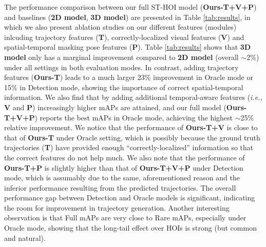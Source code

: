 \documentclass[sigconf]{acmart}
\begin{document}
The performance comparison between our full ST-HOI model (\textbf{Ours-T+V+P}) and baselines (\textbf{2D model}, \textbf{3D model}) are presented in Table \ref{tab:results}, in which we also present ablation studies on our different features (modules) inlcuding trajectory features (\textbf{T}), correctly-localized visual features (\textbf{V}) and spatial-temporal masking pose features (\textbf{P}).
Table \ref{tab:results} shows that \textbf{3D model} only has a marginal improvement compared to \textbf{2D model} (overall $\sim$2\%) under all settings in both evaluation modes.
In contrast, adding trajectory features (\textbf{Ours-T}) leads to a much larger 23\% improvement in {\selectfont Oracle} mode or 15\% in {\selectfont Detection} mode, showing the importance of correct spatial-temporal information.
We also find that by adding additional temporal-aware features (\emph{i.e.,} \textbf{V} and \textbf{P}) increasingly higher mAPs are attained, and our full model (\textbf{Ours-T+V+P}) reports the best mAPs in {\selectfont Oracle} mode, achieving the highest $\sim$25\% relative improvement.
We notice that the performance of \textbf{Ours-T+V} is close to that of \textbf{Ours-T} under {\selectfont Oracle} setting, which is possibly because the ground truth trajectories (\textbf{T}) have provided enough ``correctly-localized'' information so that the correct features do not help much.
We also note that the performance of \textbf{Ours-T+P} is slightly higher than that of \textbf{Ours-T+V+P} under {\selectfont Detection} mode, which is assumably due to the same, aforementioned reason and the inferior performance resulting from the predicted trajectories.
The overall performance gap between {\selectfont Detection} and {\selectfont Oracle} models is significant, indicating the room for improvement in trajectory generation.
Another interesting observation is that Full mAPs are very close to Rare mAPs, especially under {\selectfont Oracle} mode, showing that the long-tail effect over HOIs is strong (but common and natural).
\end{document}
